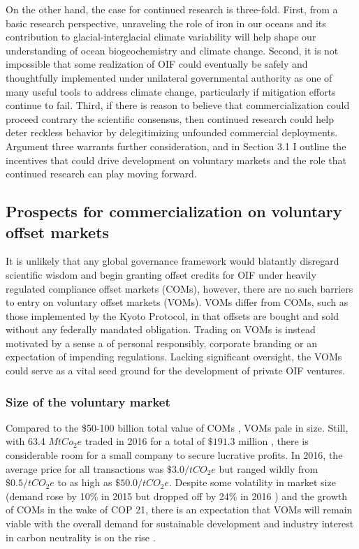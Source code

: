 On the other hand, the case for continued research is three-fold. First, from a basic research perspective, unraveling the role of iron in our oceans and its contribution to glacial-interglacial climate variability will help shape our understanding of ocean biogeochemistry and climate change. Second, it is not impossible that some realization of OIF could eventually be safely and thoughtfully implemented under unilateral governmental authority as one of many useful tools to address climate change, particularly if mitigation efforts continue to fail. Third, if there is reason to believe that commercialization could proceed contrary the scientific consensus, then continued research could help deter reckless behavior by delegitimizing unfounded commercial deployments. Argument three warrants further consideration, and in Section 3.1 I outline the incentives that could drive development on voluntary markets and the role that continued research can play moving forward.

\subsection{Prospects for commercialization on voluntary offset markets}

It is unlikely that any global governance framework would blatantly disregard scientific wisdom and begin granting offset credits for OIF under heavily regulated compliance offset markets (COMs), however, there are no such barriers to entry on voluntary offset markets (VOMs). VOMs differ from COMs, such as those implemented by the Kyoto Protocol, in that offsets are bought and sold without any federally mandated obligation. Trading on VOMs is instead motivated by a sense a of personal responsibly, corporate branding or an expectation of impending regulations. Lacking significant oversight, the VOMs could serve as a vital seed ground for the development of private OIF ventures. 

\subsubsection{Size of the voluntary market}

Compared to the \$50-100 billion total value of COMs \parencite{CarbonMarketMonitor2016}, VOMs pale in size. Still, with 63.4 $MtCo_2e$ traded in 2016 for a total of $\$191.3$ million \parencite{HamrickUnlockingPotentialState2017}, there is considerable room for a small company to secure lucrative profits. In 2016, the average price for all transactions was $\$3.0/tCO_2e$ but ranged wildly from $\$0.5/tCO_2e$ to as high as $\$50.0/tCO_2e$. Despite some volatility in market size (demand rose by 10\% in 2015 \parencite{HamrickRaisingAmbitionState2016} but dropped off by 24\% in 2016 \parencite{HamrickUnlockingPotentialState2017}) and the growth of COMs in the wake of COP 21, there is an expectation that VOMs will remain viable with the overall demand for sustainable development and industry interest in carbon neutrality is on the rise \parencite{HamrickUnlockingPotentialState2017}. 
